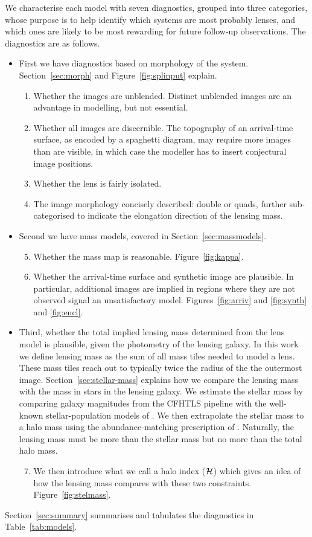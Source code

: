 We characterise each model with seven diagnostics, grouped into three 
categories, whose purpose is to help identify which systems are most probably 
lenses, and which ones are likely to be most rewarding for future follow-up 
observations. The diagnostics are as follows.

\begin{itemize}
\item First we have diagnostics based on morphology of the
  system.
  Section~\ref{sec:morph} and Figure~\ref{fig:splinput} explain.
\begin{enumerate}
\item Whether the images are unblended.  Distinct unblended images are
  an advantage in modelling, but not essential.
\item Whether all images are discernible.  The topography of an
  arrival-time surface, as encoded by a spaghetti diagram, may require
  more images than are visible, in which case the modeller has to
  insert conjectural image positions.
\item Whether the lens is fairly isolated.
\item The image morphology concisely described: double or quads,
  further sub-categorised to indicate the elongation direction of the
  lensing mass.
\end{enumerate}
\item Second we have mass models, covered in Section~\ref{sec:massmodels}.
\begin{enumerate}
\setcounter{enumi}{4}
\item Whether the mass map is reasonable. Figure~\ref{fig:kappa}.
\item Whether the arrival-time surface and synthetic image are
  plausible.  In particular, additional images are implied in regions
  where they are not observed signal an unsatisfactory model.
  Figures~\ref{fig:arriv} and \ref{fig:synth} and \ref{fig:encl}.
\end{enumerate}
\item Third, whether the total implied lensing mass
  determined from the lens model is plausible, given the
  photometry of the lensing galaxy.
  In this work we define lensing mass as the sum of all mass tiles
  needed to model a lens. These mass tiles reach out to typically twice
  the radius of the the outermost image.
  Section~\ref{sec:stellar-mass}
  explains how we compare the lensing mass with the mass in stars in
  the lensing galaxy.  We estimate the stellar mass by comparing
  galaxy magnitudes from the CFHTLS pipeline with the well-known
  stellar-population models of \cite{2003MNRAS.344.1000B}.  We then
  extrapolate the stellar mass to a halo mass using the
  abundance-matching prescription of \cite{2010ApJ...710..903M}.
  Naturally, the lensing mass must be more than the stellar mass but
  no more than the total halo mass.
\begin{enumerate}
\setcounter{enumi}{6}
\item We then introduce what we call a halo index ($\mathcal{H}$) which
  gives an idea of how the lensing mass compares with these two
  constraints.  Figure~\ref{fig:stelmass}.
\end{enumerate}
\end{itemize}

Section~\ref{sec:summary} summarises and tabulates the diagnostics in
Table~\ref{tab:models}.




